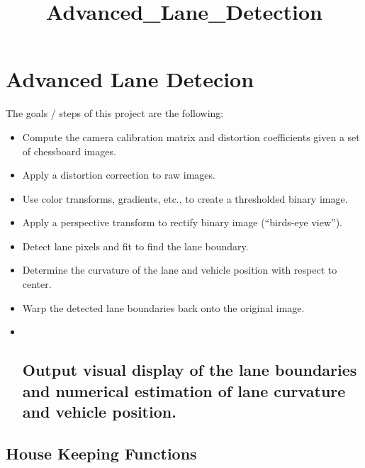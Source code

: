 \documentclass[11pt]{article}
\title{Advanced\_Lane\_Detection}
\begin{document}
    
    
    \maketitle
    
    

    
    \hypertarget{advanced-lane-detecion}{%
\section{Advanced Lane Detecion}\label{advanced-lane-detecion}}

The goals / steps of this project are the following:

\begin{itemize}
\item
  Compute the camera calibration matrix and distortion coefficients
  given a set of chessboard images.
\item
  Apply a distortion correction to raw images.
\item
  Use color transforms, gradients, etc., to create a thresholded binary
  image.
\item
  Apply a perspective transform to rectify binary image (``birds-eye
  view'').
\item
  Detect lane pixels and fit to find the lane boundary.
\item
  Determine the curvature of the lane and vehicle position with respect
  to center.
\item
  Warp the detected lane boundaries back onto the original image.
\item ~
  \hypertarget{output-visual-display-of-the-lane-boundaries-and-numerical-estimation-of-lane-curvature-and-vehicle-position.}{%
  \subsection{Output visual display of the lane boundaries and numerical
  estimation of lane curvature and vehicle
  position.}\label{output-visual-display-of-the-lane-boundaries-and-numerical-estimation-of-lane-curvature-and-vehicle-position.}}
\end{itemize}

    \hypertarget{house-keeping-functions}{%
\subsection{House Keeping Functions}\label{house-keeping-functions}}
\end{document}
